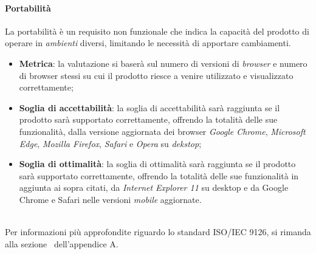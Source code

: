 \paragraph{Portabilità}
La portabilità è un requisito non funzionale che indica la capacità del prodotto di operare in \textit{ambienti} diversi, limitando le necessità di apportare cambiamenti.
\begin{itemize}
	\item \textbf{Metrica}: la valutazione si baserà sul numero di versioni di \emph{browser} e numero di browser stessi su cui il prodotto riesce a venire utilizzato e visualizzato correttamente;
	\item \textbf{Soglia di accettabilità}: la soglia di accettabilità sarà raggiunta se il prodotto sarà supportato correttamente, offrendo la totalità delle sue funzionalità, dalla versione aggiornata dei browser \emph{Google Chrome}, \emph{Microsoft Edge}, \emph{Mozilla Firefox}, \emph{Safari} e \emph{Opera} su \emph{dekstop};
	\item \textbf{Soglia di ottimalità}: la soglia di ottimalità sarà raggiunta se il prodotto sarà supportato correttamente, offrendo la totalità delle sue funzionalità in aggiunta ai sopra citati, da \emph{Internet Explorer 11} su desktop e da Google Chrome e Safari nelle versioni \emph{mobile} aggiornate.
\end{itemize}

~\\
Per informazioni più approfondite riguardo lo standard ISO/IEC 9126, si rimanda alla sezione~ dell'appendice A.



